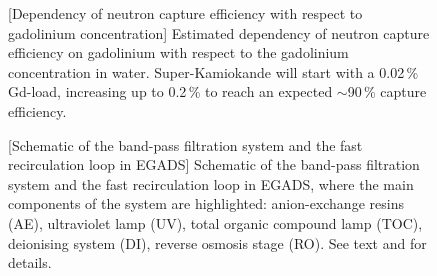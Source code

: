 \begin{figure}
	\begin{minipage}[t]{0.48\textwidth}
		\centering
		\resizebox{\linewidth}{!}{}
		[Dependency of neutron capture efficiency with respect to gadolinium concentration]%
		{Estimated dependency of neutron capture efficiency on gadolinium with respect to the gadolinium %
		concentration in water. Super-Kamiokande will start with a 0.02\,\% Gd-load, %
		increasing up to 0.2\,\% to reach an expected $\sim$90\,\% capture efficiency.}
		\label{fig:gd_conc}
	\end{minipage}
	\hfill
	\begin{minipage}[t]{0.5\textwidth}
		\centering
		[Schematic of the band-pass filtration system and the fast recirculation loop in EGADS]%
		{Schematic of the band-pass filtration system and the fast recirculation loop in EGADS, %
		where the main components of the system are highlighted: anion-exchange resins (AE), %
		ultraviolet lamp (UV), total organic compound lamp (TOC), deionising system (DI), %
		reverse osmosis stage (RO). See text and  for details. }
		\label{fig:egads}
	\end{minipage}
\end{figure}


